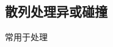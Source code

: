 \documentclass{article}
\begin{document}
\subsection{散列处理异或碰撞}
常用于处理


% 

% 


% 
% 
% 
\end{document}
